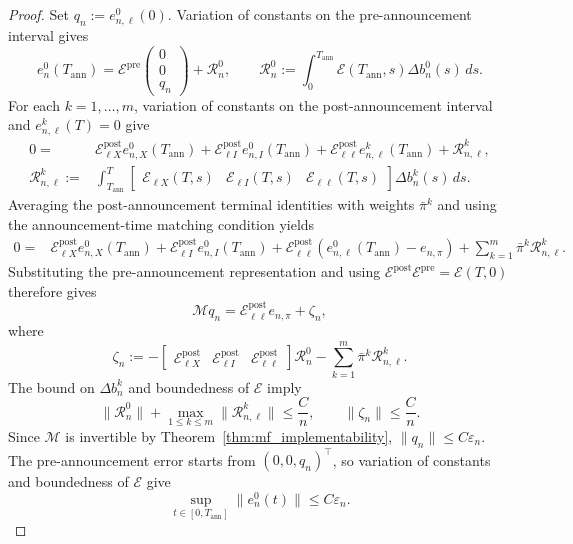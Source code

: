 \documentclass[12pt]{article}
\numberwithin{equation}{section}
\theoremstyle{definition}
\begin{document}
\begin{proof}
Set \(q_n:=e_{n,\ell}^0(0)\). Variation of constants on the
pre-announcement interval gives
\[
e_n^0(T_{\mathrm{ann}})
=
\mathcal E^{\mathrm{pre}}
\begin{pmatrix}
0\\0\\q_n
\end{pmatrix}
+\mathcal R_n^0,
\qquad
\mathcal R_n^0
:=
\int_0^{T_{\mathrm{ann}}}
\mathcal E(T_{\mathrm{ann}},s)\Delta b_n^0(s)\,ds.
\]
For each \(k=1,\ldots,m\), variation of constants on the
post-announcement interval and \(e_{n,\ell}^k(T)=0\) give
\begin{equation}\label{eq:finite_common_post_error_terminal_identity}
\begin{aligned}
0
={}&
\mathcal E^{\mathrm{post}}_{\ell X}e_{n,X}^0(T_{\mathrm{ann}})
+\mathcal E^{\mathrm{post}}_{\ell I}e_{n,I}^0(T_{\mathrm{ann}})
+\mathcal E^{\mathrm{post}}_{\ell\ell}e_{n,\ell}^k(T_{\mathrm{ann}})
+\mathcal R_{n,\ell}^k,
\\
\mathcal R_{n,\ell}^k
:={}&
\int_{T_{\mathrm{ann}}}^T
\begin{bmatrix}
\mathcal E_{\ell X}(T,s)&
\mathcal E_{\ell I}(T,s)&
\mathcal E_{\ell\ell}(T,s)
\end{bmatrix}
\Delta b_n^k(s)\,ds.
\end{aligned}
\end{equation}
Averaging the post-announcement terminal identities with weights
\(\bar\pi^k\) and using the announcement-time matching condition yields
\[
\begin{aligned}
0
={}&
\mathcal E^{\mathrm{post}}_{\ell X}e_{n,X}^0(T_{\mathrm{ann}})
+\mathcal E^{\mathrm{post}}_{\ell I}e_{n,I}^0(T_{\mathrm{ann}})
+
\mathcal E^{\mathrm{post}}_{\ell\ell}
\left(e_{n,\ell}^0(T_{\mathrm{ann}})-e_{n,\pi}\right)
+\sum_{k=1}^m\bar\pi^k\mathcal R_{n,\ell}^k.
\end{aligned}
\]
Substituting the pre-announcement representation and using
\(\mathcal E^{\mathrm{post}}\mathcal E^{\mathrm{pre}}=\mathcal E(T,0)\)
therefore gives
\[
\mathcal Mq_n
=
\mathcal E^{\mathrm{post}}_{\ell\ell}e_{n,\pi}
+\zeta_n,
\]
where
\[
\zeta_n
:=
-
\begin{bmatrix}
\mathcal E^{\mathrm{post}}_{\ell X}&
\mathcal E^{\mathrm{post}}_{\ell I}&
\mathcal E^{\mathrm{post}}_{\ell\ell}
\end{bmatrix}
\mathcal R_n^0
-
\sum_{k=1}^m\bar\pi^k\mathcal R_{n,\ell}^k.
\]
The bound on \(\Delta b_n^k\) and boundedness of \(\mathcal E\) imply
\[
\|\mathcal R_n^0\|
+\max_{1\leq k\leq m}\|\mathcal R_{n,\ell}^k\|
\leq\frac{C}{n},
\qquad
\|\zeta_n\|\leq\frac{C}{n}.
\]
Since \(\mathcal M\) is invertible by
Theorem~\ref{thm:mf_implementability},
\(\|q_n\|\leq C\varepsilon_n\). The pre-announcement error starts from
\((0,0,q_n)^\top\), so variation of constants and boundedness of
\(\mathcal E\) give
\[
\sup_{t\in[0,T_{\mathrm{ann}}]}\|e_n^0(t)\|
\leq C\varepsilon_n.
\]


\end{proof}
\end{document}
